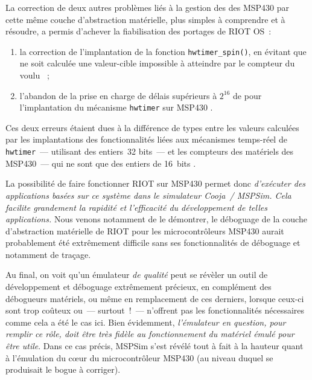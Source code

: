 La correction de deux autres problèmes liés à la gestion des 
des MSP430 par cette même couche d'abstraction matérielle, plus simples à
comprendre et à résoudre, a permis d'achever la fiabilisation des portages
de RIOT OS~:
\begin{enumerate}
\item la correction de l'implantation de la fonction \texttt{hwtimer\_spin()},
en évitant que ne soit calculée une valeur-cible impossible à atteindre
par le compteur du  voulu \cite{PRriotFix1MSP430}~;
\item l'abandon de la prise en charge de délais supérieurs à $2^{16}$
 de  pour l'implantation du mécanisme
\texttt{hwtimer} sur MSP430 \cite{PRriotFix3MSP430}.
\end{enumerate}
Ces deux erreurs étaient dues à la différence de types entre les valeurs
calculées par les implantations des fonctionnalités liées aux mécanismes
temps-réel de \texttt{hwtimer}~--- utilisant des entiers~32 bits~--- et
les compteurs des  matériels des MSP430~--- qui ne sont
que des entiers de 16~bits \footnotemark[2].


\medskip

La possibilité de faire fonctionner RIOT sur MSP430 permet donc
\emph{d'exécuter des applications basées sur ce système dans le simulateur
Cooja~/ MSPSim. Cela facilite grandement la rapidité et l'efficacité
du développement de telles applications.} Nous venons notamment de le
démontrer, le déboguage de la couche d'abstraction matérielle de RIOT pour
les microcontrôleurs MSP430 aurait probablement été extrêmement difficile
sans ses fonctionnalités de déboguage et notamment de traçage.

Au final, on voit qu'un émulateur \emph{de qualité} peut se révèler un outil
de développement et déboguage extrêmement précieux, en complément des
débogueurs matériels, ou même en remplacement de ces derniers, lorsque
ceux-ci sont trop coûteux ou~--- surtout~!~--- n'offrent pas les
fonctionnalités nécessaires comme cela a été le cas ici. Bien évidemment,
\emph{l'émulateur en question, pour remplir ce rôle, doit être très fidèle
au fonctionnement du matériel émulé pour être utile}. Dans ce cas précis,
MSPSim s'est révélé tout à fait à la hauteur quant à l'émulation du c{\oe}ur
du microcontrôleur MSP430 (au niveau duquel se produisait le bogue à
corriger).

